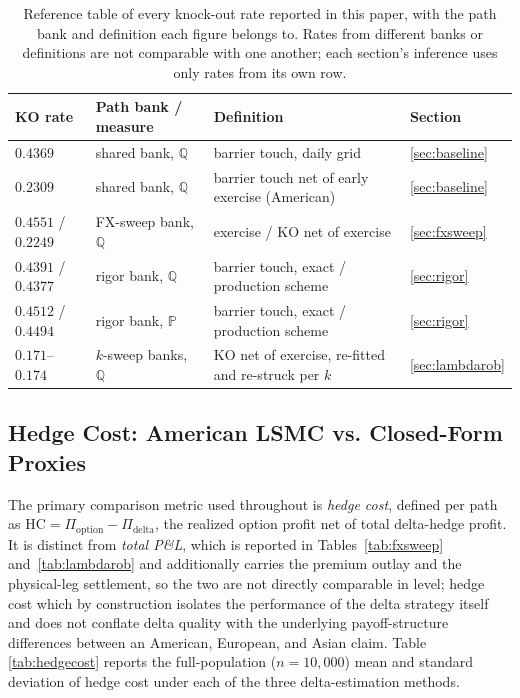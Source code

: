 \documentclass[11pt,a4paper]{article}
\begin{document}
\begin{table}[h]
\centering
\small
\begin{tabular}{llll}
\toprule
KO rate & Path bank / measure & Definition & Section \\
\midrule
$0.4369$ & shared bank, $\mathbb Q$ & barrier touch, daily grid & \ref{sec:baseline} \\
$0.2309$ & shared bank, $\mathbb Q$ & barrier touch net of early exercise (American) & \ref{sec:baseline} \\
$0.4551$ / $0.2249$ & FX-sweep bank, $\mathbb Q$ & exercise / KO net of exercise & \ref{sec:fxsweep} \\
$0.4391$ / $0.4377$ & rigor bank, $\mathbb Q$ & barrier touch, exact / production scheme & \ref{sec:rigor} \\
$0.4512$ / $0.4494$ & rigor bank, $\mathbb P$ & barrier touch, exact / production scheme & \ref{sec:rigor} \\
$0.171$--$0.174$ & $k$-sweep banks, $\mathbb Q$ & KO net of exercise, re-fitted and re-struck per $k$ & \ref{sec:lambdarob} \\
\bottomrule
\end{tabular}
\caption{Reference table of every knock-out rate reported in this paper, with the path bank and definition each figure belongs to. Rates from different banks or definitions are not comparable with one another; each section's inference uses only rates from its own row.}
\label{tab:koref}
\end{table}

\subsection{Hedge Cost: American LSMC vs. Closed-Form Proxies}
\label{sec:hedgecost}

The primary comparison metric used throughout is \emph{hedge cost}, defined per path as $\mathrm{HC}=\Pi_{\mathrm{option}}-\Pi_{\mathrm{delta}}$, the realized option profit net of total delta-hedge profit. It is distinct from \emph{total P\&L}, which is reported in Tables~\ref{tab:fxsweep} and~\ref{tab:lambdarob} and additionally carries the premium outlay and the physical-leg settlement, so the two are not directly comparable in level; hedge cost which by construction isolates the performance of the delta strategy itself and does not conflate delta quality with the underlying payoff-structure differences between an American, European, and Asian claim. Table \ref{tab:hedgecost} reports the full-population ($n=10{,}000$) mean and standard deviation of hedge cost under each of the three delta-estimation methods.
\end{document}

